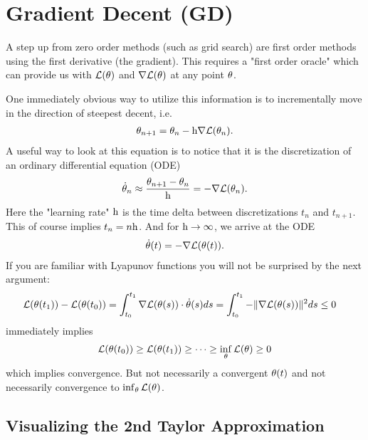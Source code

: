 
\chapter{Gradient Decent (GD)}

A step up from zero order methods (such as grid search) are first order methods
using the first derivative (the gradient). This requires a "first order oracle"
which can provide us with \(\mathcal{L}(\theta)\) and \(\nabla \mathcal{L}(\theta)\) at any point
\(\theta\).

One immediately obvious way to utilize this information is to
incrementally move in the direction of steepest decent, i.e.
%
\begin{align*}
	\theta_{n+1} = \theta_n - \text{h}\nabla \mathcal{L}(\theta_n).
\end{align*}
%
A useful way to look at this equation is to notice that it is the
discretization of an ordinary differential equation (ODE)
%
\begin{align*}
	\dot{\theta}_n \approx \frac{\theta_{n+1} - \theta_n}{\text{h}}
	= - \nabla \mathcal{L}(\theta_n).
\end{align*}
%
Here the "learning rate" \(\text{h}\) is the time delta between discretizations
\(t_n\) and \(t_{n+1}\). This of course implies \(t_n = n\text{h}\). And for
\(\text{h}\to\infty\), we arrive at the ODE
%
\begin{align}\label{eq: velocity is gradient}
	\dot{\theta}(t) = -\nabla \mathcal{L}(\theta(t)).
\end{align}
%
If you are familiar with Lyapunov functions you will not be surprised by the next
argument:
%
\begin{align}\label{eq: gradient integral}
	\mathcal{L}(\theta(t_1)) - \mathcal{L}(\theta(t_0))
	&= \int_{t_0}^{t_1} \nabla \mathcal{L}(\theta(s)) \cdot \dot{\theta}(s) ds
	= \int_{t_0}^{t_1} -\|\nabla \mathcal{L}(\theta(s))\|^2 ds
	\le 0
\end{align}
%
immediately implies
\begin{align*}
	\mathcal{L}(\theta(t_0)) \ge \mathcal{L}(\theta(t_1)) \ge \dots \ge \inf_\theta \mathcal{L}(\theta) \ge 0
\end{align*}
which implies convergence. But not necessarily a convergent \(\theta(t)\) and
not necessarily convergence to \(\inf_\theta \mathcal{L}(\theta)\).

\section{Visualizing the 2nd Taylor Approximation}\label{sec: visualize gd}

